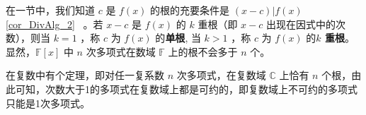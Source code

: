 在一节中，我们知道 $c$ 是 $f(x)$ 的根的充要条件是 $(x-c)|f(x)$ \autoref{cor_DivAlg_2}~ 。若 $x-c$ 是 $f(x)$ 的 $k$ 重根（即 $x-c$ 出现在因式中的次数），则当 $k=1$ ，称 $c$ 为 $f(x)$ 的\textbf{单根}, 当 $k>1$ ，称 $c$ 为 $f(x)$ 的\textbf{$k$ 重根}。显然，$\mathbb{F}[x]$ 中 $n$ 次多项式在数域 $\mathbb{F}$ 上的根不会多于 $n$ 个。

在复数中有个定理，即对任一复系数 $n$ 次多项式，在复数域 $\mathbb{C}$ 上恰有 $n$ 个根，由此可知，次数大于1的多项式在复数域上都是可约的，即复数域上不可约的多项式只能是1次多项式。
